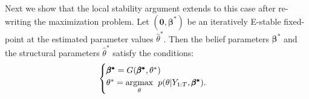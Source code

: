 \begin{appendix}

Next we show that the local stability argument extends to this case after re-writing the maximization problem. Let $(\pmb{0},\pmb{\beta^{*}})$ be an iteratively E-stable fixed-point at the estimated parameter values $\hat{\theta}^{*}$. Then the belief parameters $\pmb{\beta^{*}}$ and the structural parameters $\hat{\theta}^{*}$ satisfy the conditions: 
\begin{equation}
\begin{cases}
\pmb{\beta^{*}}=G(\pmb{\beta^{*}},\theta^{*}) \\
\theta^{*}=\underset{\theta}{\operatorname{argmax}} \hspace{2 mm} p(\theta | Y_{1:T},\pmb{\beta^{*}}).
\end{cases}
\end{equation}


\end{appendix}
